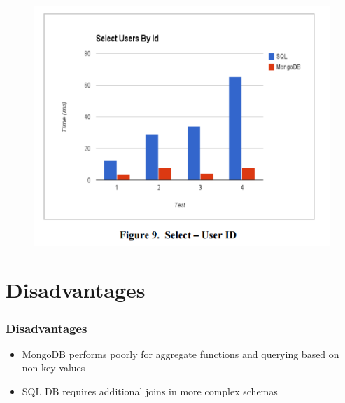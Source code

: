 \documentclass{beamer}
\begin{document}
\begin{frame}
\begin{itemize}
\begin{figure}[!htb]
                        \endminipage\hfill
                            \includegraphics[width=\linewidth]{select}
                        \endminipage\hfill
                    \end{figure}
                \blindtext            
			\end{itemize}
		\end{frame}
		
	\section{Disadvantages}
		\begin{frame}
		\frametitle{Disadvantages}
            \begin{itemize}
	            \item MongoDB performs poorly for aggregate functions and querying based on non-key values
	            \item SQL DB requires additional joins in more complex schemas
	       \end{itemize}
		\end{frame}
		
\end{document}

